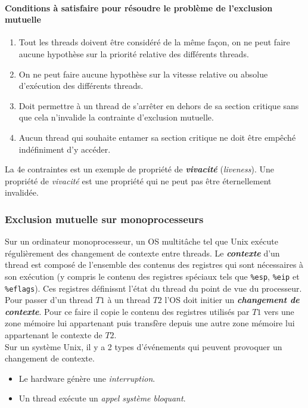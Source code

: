 \paragraph{Conditions à satisfaire pour résoudre le problème de l'exclusion mutuelle}
\begin{enumerate}
  \item Tout les threads doivent être considéré de la même façon, on ne peut faire aucune hypothèse sur la priorité relative des différents threads.
  \item On ne peut faire aucune hypothèse sur la vitesse relative ou absolue d'exécution des différents threads.
  \item Doit permettre à un thread de s'arrêter en dehors de sa section critique sans que cela n'invalide la contrainte d'exclusion mutuelle.
  \item Aucun thread qui souhaite entamer sa section critique ne doit être empêché indéfiniment d'y accéder.
\end{enumerate}

La 4e contraintes est un exemple de propriété de \textit{\textbf{vivacité}} (\textit{liveness}).
Une propriété de \textit{vivacité} est une propriété qui ne peut pas être éternellement invalidée.

\subsubsection*{Exclusion mutuelle sur monoprocesseurs}
Sur un ordinateur monoprocesseur, un OS multitâche tel que Unix exécute régulièrement des changement de contexte entre threads.
Le \textit{\textbf{contexte}} d'un thread est composé de l'ensemble des contenus des registres qui sont nécessaires à son exécution (y compris le contenu des registres spéciaux tels que \texttt{\%esp}, \texttt{\%eip} et \texttt{\%eflags}).
Ces registres définissnt l'état du thread du point de vue du processeur. \\
Pour passer d'un thread $T1$ à un thread $T2$ l'OS doit initier un \textbf{\textit{changement de contexte}}.
Pour ce faire il copie le contenu des registres utilisés par $T1$ vers une zone mémoire lui appartenant puis transfère depuis une autre zone mémoire lui appartenant le contexte de $T2$.\\

Sur un système Unix, il y a 2 types d'événements qui peuvent provoquer un changement de contexte.
\begin{itemize}
  \item Le hardware génère une \textit{interruption}.
  \item Un thread exécute un \textit{appel système bloquant}.
\end{itemize}

